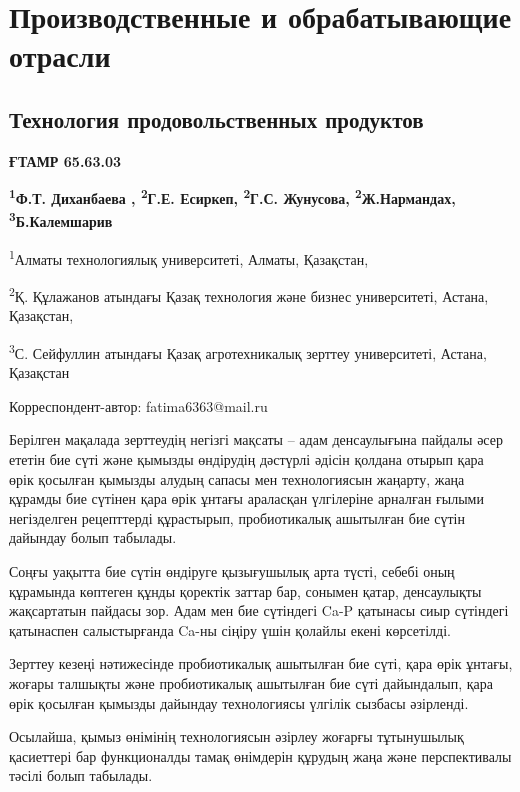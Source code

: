 \let\cleardoublepage\clearpage
\part{Производственные и обрабатывающие отрасли}
\chapter{Технология продовольственных продуктов}

{\bfseries ҒТАМР 65.63.03}


\begin{center}
{\bfseries \textsuperscript{1}Ф.Т. Диханбаева , \textsuperscript{2}Г.Е. Есиркеп, \textsuperscript{2}Г.С. Жунусова, \textsuperscript{2}Ж.Нармандах, \textsuperscript{3}Б.Калемшарив}

\textsuperscript{1}Алматы технологиялық университеті, Алматы, Қазақстан,

\textsuperscript{2}Қ. Құлажанов атындағы Қазақ технология және бизнес
университеті, Астана, Қазақстан,

\textsuperscript{3}С. Сейфуллин атындағы Қазақ агротехникалық зерттеу
университеті, Астана, Қазақстан

Корреспондент-автор: fatima6363@mail.ru
\end{center}

Берілген мақалада зерттеудің негізгі мақсаты -- адам денсаулығына
пайдалы әсер ететін бие сүті және қымызды өндірудің дәстүрлі әдісін
қолдана отырып қара өрік қосылған қымызды алудың сапасы мен
технологиясын жаңарту, жаңа құрамды бие сүтінен қара өрік ұнтағы
араласқан үлгілеріне арналған ғылыми негізделген рецепттерді құрастырып,
пробиотикалық ашытылған бие сүтін дайындау болып табылады.

Соңғы уақытта бие сүтін өндіруге қызығушылық арта түсті, себебі оның
құрамында көптеген құнды қоректік заттар бар, сонымен қатар, денсаулықты
жақсартатын пайдасы зор. Адам мен бие сүтіндегі Ca-P қатынасы сиыр
сүтіндегі қатынаспен салыстырғанда Ca-ны сіңіру үшін қолайлы екені
көрсетілді.

Зерттеу кезеңі нәтижесінде пробиотикалық ашытылған бие сүті, қара өрік
ұнтағы, жоғары талшықты және пробиотикалық ашытылған бие сүті
дайындалып, қара өрік қосылған қымызды дайындау технологиясы үлгілік
сызбасы әзірленді.

Осылайша, қымыз өнімінің технологиясын әзірлеу жоғарғы тұтынушылық
қасиеттері бар функционалды тамақ өнімдерін құрудың жаңа және
перспективалы тәсілі болып табылады.

